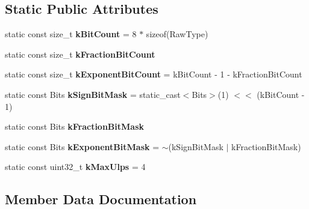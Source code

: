 \subsection*{Static Public Attributes}
\begin{DoxyCompactItemize}
\item 
\mbox{\label{classtesting_1_1internal_1_1FloatingPoint_ab819d2e8f93e9e482373999f0f8d71b9}} 
static const size\+\_\+t {\bfseries k\+Bit\+Count} = 8 $\ast$ sizeof(Raw\+Type)
\item 
static const size\+\_\+t {\bfseries k\+Fraction\+Bit\+Count}
\item 
\mbox{\label{classtesting_1_1internal_1_1FloatingPoint_a1973d843c00781053d3073daa8a40119}} 
static const size\+\_\+t {\bfseries k\+Exponent\+Bit\+Count} = k\+Bit\+Count -\/ 1 -\/ k\+Fraction\+Bit\+Count
\item 
\mbox{\label{classtesting_1_1internal_1_1FloatingPoint_aca98b5ea6f2222a66a82e52421682efa}} 
static const Bits {\bfseries k\+Sign\+Bit\+Mask} = static\+\_\+cast$<$Bits$>$(1) $<$$<$ (k\+Bit\+Count -\/ 1)
\item 
static const Bits {\bfseries k\+Fraction\+Bit\+Mask}
\item 
\mbox{\label{classtesting_1_1internal_1_1FloatingPoint_a66065dfc4d5f41100f686159637af23b}} 
static const Bits {\bfseries k\+Exponent\+Bit\+Mask} = $\sim$(k\+Sign\+Bit\+Mask $\vert$ k\+Fraction\+Bit\+Mask)
\item 
\mbox{\label{classtesting_1_1internal_1_1FloatingPoint_adeb0569a334b30329f1edf732f21c5ea}} 
static const uint32\+\_\+t {\bfseries k\+Max\+Ulps} = 4
\end{DoxyCompactItemize}


\subsection{Member Data Documentation}
\mbox{\label{classtesting_1_1internal_1_1FloatingPoint_a0b756a6d2a4f5f5b41ca79651c06c043}} 
